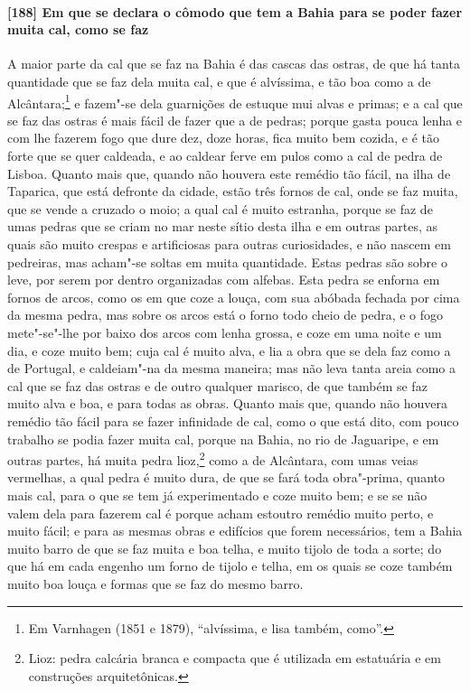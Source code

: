 \paragraph{[188] Em que se declara o cômodo que tem a Bahia para se poder fazer muita cal,
como se faz}\quad
A maior parte da cal que se faz na Bahia é das cascas das ostras, de que há tanta
quantidade que se faz dela muita cal, e que é alvíssima, e tão boa como a de
Alcântara;\footnote{ Em Varnhagen (1851 e 1879), ``alvíssima, e lisa também, como''.} e
fazem"-se dela guarnições de estuque mui alvas e primas; e a cal que se faz das ostras é
mais fácil de fazer que a de pedras; porque gasta pouca lenha e com lhe fazerem fogo que
dure dez, doze horas, fica muito bem cozida, e é tão forte que se quer caldeada, e ao
caldear ferve em pulos como a cal de pedra de Lisboa. Quanto mais que, quando não houvera
este remédio tão fácil, na ilha de Taparica, que está defronte da cidade, estão três
fornos de cal, onde se faz muita, que se vende a cruzado o moio; a qual cal é muito
estranha, porque se faz de umas pedras que se criam no mar neste sítio desta ilha e em
outras partes, as quais são muito crespas e artificiosas para outras curiosidades, e não
nascem em pedreiras, mas acham"-se soltas em muita quantidade. Estas pedras são sobre o
leve, por serem por dentro organizadas com alfebas. Esta pedra se enforna em fornos de
arcos, como os em que coze a louça, com sua abóbada fechada por cima da mesma pedra, mas
sobre os arcos está o forno todo cheio de pedra, e o fogo mete"-se"-lhe por baixo dos arcos
com lenha grossa, e coze em uma noite e um dia, e coze muito bem; cuja cal é muito alva, e
lia a obra que se dela faz como a de Portugal, e caldeiam"-na da mesma maneira; mas não
leva tanta areia como a cal que se faz das ostras e de outro qualquer marisco, de que
também se faz muito alva e boa, e para todas as obras. Quanto mais que, quando não houvera
remédio tão fácil para se fazer infinidade de cal, como o que está dito, com pouco
trabalho se podia fazer muita cal, porque na Bahia, no rio de Jaguaripe, e em outras
partes, há muita pedra lioz,\footnote{ Lioz: pedra calcária branca e compacta que é
utilizada em estatuária e em construções arquitetônicas.} como a de Alcântara, com umas
veias vermelhas, a qual pedra é muito dura, de que se fará toda obra"-prima, quanto mais
cal, para o que se tem já experimentado e coze muito bem; e se se não valem dela para
fazerem cal é porque acham estoutro remédio muito perto, e muito fácil; e para as mesmas
obras e edifícios que forem necessários, tem a Bahia muito barro de que se faz muita e boa
telha, e muito tijolo de toda a sorte; do que há em cada engenho um forno de tijolo e
telha, em os quais se coze também muito boa louça e formas que se faz do mesmo barro.

